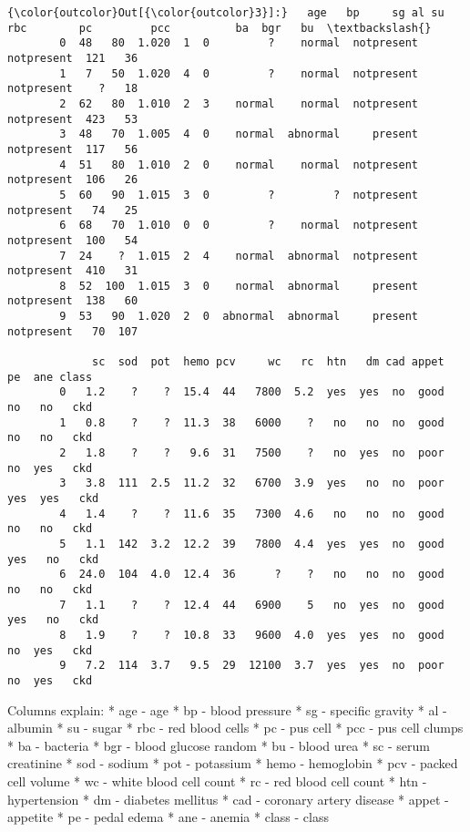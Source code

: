 \documentclass[11pt]{article}
\begin{document}
\begin{Verbatim}[commandchars=\\\{\}]
{\color{outcolor}Out[{\color{outcolor}3}]:}   age   bp     sg al su       rbc        pc         pcc          ba  bgr   bu  \textbackslash{}
        0  48   80  1.020  1  0         ?    normal  notpresent  notpresent  121   36   
        1   7   50  1.020  4  0         ?    normal  notpresent  notpresent    ?   18   
        2  62   80  1.010  2  3    normal    normal  notpresent  notpresent  423   53   
        3  48   70  1.005  4  0    normal  abnormal     present  notpresent  117   56   
        4  51   80  1.010  2  0    normal    normal  notpresent  notpresent  106   26   
        5  60   90  1.015  3  0         ?         ?  notpresent  notpresent   74   25   
        6  68   70  1.010  0  0         ?    normal  notpresent  notpresent  100   54   
        7  24    ?  1.015  2  4    normal  abnormal  notpresent  notpresent  410   31   
        8  52  100  1.015  3  0    normal  abnormal     present  notpresent  138   60   
        9  53   90  1.020  2  0  abnormal  abnormal     present  notpresent   70  107   
        
             sc  sod  pot  hemo pcv     wc   rc  htn   dm cad appet   pe  ane class  
        0   1.2    ?    ?  15.4  44   7800  5.2  yes  yes  no  good   no   no   ckd  
        1   0.8    ?    ?  11.3  38   6000    ?   no   no  no  good   no   no   ckd  
        2   1.8    ?    ?   9.6  31   7500    ?   no  yes  no  poor   no  yes   ckd  
        3   3.8  111  2.5  11.2  32   6700  3.9  yes   no  no  poor  yes  yes   ckd  
        4   1.4    ?    ?  11.6  35   7300  4.6   no   no  no  good   no   no   ckd  
        5   1.1  142  3.2  12.2  39   7800  4.4  yes  yes  no  good  yes   no   ckd  
        6  24.0  104  4.0  12.4  36      ?    ?   no   no  no  good   no   no   ckd  
        7   1.1    ?    ?  12.4  44   6900    5   no  yes  no  good  yes   no   ckd  
        8   1.9    ?    ?  10.8  33   9600  4.0  yes  yes  no  good   no  yes   ckd  
        9   7.2  114  3.7   9.5  29  12100  3.7  yes  yes  no  poor   no  yes   ckd  
\end{Verbatim}
            
    Columns explain: * age - age * bp - blood pressure * sg - specific
gravity * al - albumin * su - sugar * rbc - red blood cells * pc - pus
cell * pcc - pus cell clumps * ba - bacteria * bgr - blood glucose
random * bu - blood urea * sc - serum creatinine * sod - sodium * pot -
potassium * hemo - hemoglobin * pcv - packed cell volume * wc - white
blood cell count * rc - red blood cell count * htn - hypertension * dm -
diabetes mellitus * cad - coronary artery disease * appet - appetite *
pe - pedal edema * ane - anemia * class - class
\end{document}
